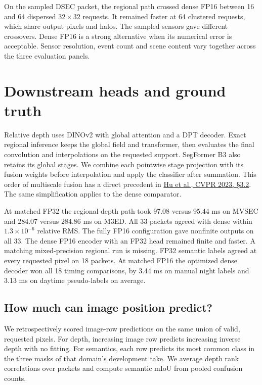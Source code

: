 \documentclass[11pt,letterpaper]{article}
\begin{document}
On the sampled DSEC packet, the regional path crossed dense FP16 between 16 and 64 dispersed $32\times32$ requests. It remained faster at 64 clustered requests, which share output pixels and halos. The sampled sensors gave different crossovers. Dense FP16 is a strong alternative when its numerical error is acceptable. Sensor resolution, event count and scene content vary together across the three evaluation panels.

\newpage
\section{Downstream heads and ground truth}
Relative depth uses DINOv2 with global attention and a DPT decoder. Exact regional inference keeps the global field and transformer, then evaluates the final convolution and interpolations on the requested support. SegFormer B3 also retains its global stages. We combine each pointwise stage projection with its fusion weights before interpolation and apply the classifier after summation. This order of multiscale fusion has a direct precedent in \href{https://openaccess.thecvf.com/content/CVPR2023/papers/Hu_You_Only_Segment_Once_Towards_Real-Time_Panoptic_Segmentation_CVPR_2023_paper.pdf}{Hu et al., CVPR 2023, \S3.2}. The same simplification applies to the dense comparator.

At matched FP32 the regional depth path took 97.08 versus 95.44 ms on MVSEC and 284.07 versus 284.86 ms on M3ED. All 33 packets agreed with dense within $1.3\times10^{-6}$ relative RMS. The fully FP16 configuration gave nonfinite outputs on all 33. The dense FP16 encoder with an FP32 head remained finite and faster. A matching mixed-precision regional run is missing. FP32 semantic labels agreed at every requested pixel on 18 packets. At matched FP16 the optimized dense decoder won all 18 timing comparisons, by 3.44 ms on manual night labels and 3.13 ms on daytime pseudo-labels on average.

\subsection{How much can image position predict?}
We retrospectively scored image-row predictions on the same union of valid, requested pixels. For depth, increasing image row predicts increasing inverse depth with no fitting. For semantics, each row predicts its most common class in the three masks of that domain's development take. We average depth rank correlations over packets and compute semantic mIoU from pooled confusion counts.
\end{document}
